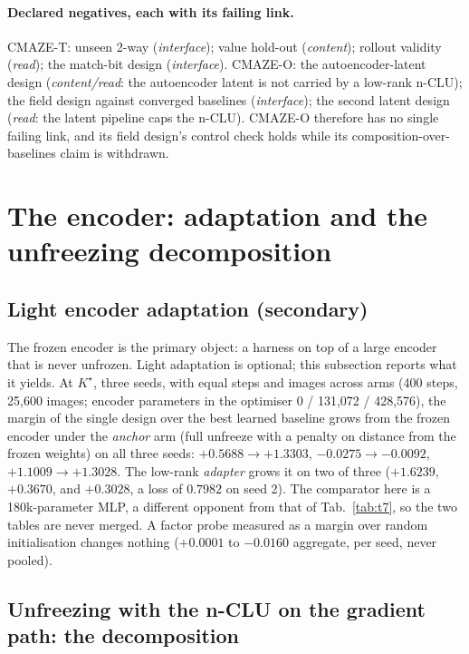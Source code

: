 \documentclass{article} %
\newcommand{\Kstar}{\ensuremath{K^{\star}}}
\begin{document}
\paragraph{Declared negatives, each with its failing link.} CMAZE-T: unseen 2-way
(\emph{interface}); value hold-out (\emph{content}); rollout validity (\emph{read}); the match-bit
design (\emph{interface}). CMAZE-O: the autoencoder-latent design (\emph{content/read}: the autoencoder latent is not carried by
a low-rank n-CLU); the field design against converged baselines (\emph{interface}); the second latent design (\emph{read}: the
latent pipeline caps the n-CLU). CMAZE-O therefore has no single failing link, and its field design's
control check holds while its composition-over-baselines claim is withdrawn.

\section{The encoder: adaptation and the unfreezing decomposition}
\label{app:encoder-main}

\subsection*{Light encoder adaptation (secondary)}

The frozen encoder is the primary object: a harness on top of a large encoder that is never
unfrozen. Light adaptation is optional; this subsection reports what it yields. At $\Kstar$, three
seeds, with equal steps and images across arms (400 steps, 25,600 images; encoder parameters in the
optimiser 0 / 131,072 / 428,576), the margin of the single design over the best learned
baseline grows from the frozen encoder under the \emph{anchor} arm (full unfreeze with a
penalty on distance from the frozen weights) on all three seeds: $+0.5688\to+1.3303$,
$-0.0275\to-0.0092$, $+1.1009\to+1.3028$. The low-rank \emph{adapter} grows it on two of
three ($+1.6239$, $+0.3670$, and $+0.3028$, a loss of $0.7982$ on seed 2).
The comparator here is a 180k-parameter MLP, a different opponent from that of
Tab.~\ref{tab:t7}, so the two tables are never merged. A factor probe measured as a margin over
random initialisation changes nothing ($+0.0001$ to $-0.0160$ aggregate, per seed, never pooled).

\subsection*{Unfreezing with the n-CLU on the gradient path: the decomposition}
\end{document}
